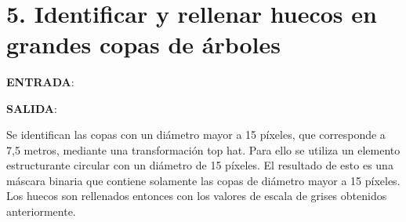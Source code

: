 \documentclass[11pt]{article}
\begin{document}
    \begin{center}
    \end{center}
    { \hspace*{\fill} \\}
    
    \hypertarget{identificar-y-rellenar-huecos-en-grandes-copas-de-uxe1rboles}{%
\section{5. Identificar y rellenar huecos en grandes copas de
árboles}\label{identificar-y-rellenar-huecos-en-grandes-copas-de-uxe1rboles}}

\textbf{ENTRADA}:

\textbf{SALIDA}:

Se identifican las copas con un diámetro mayor a 15 píxeles, que
corresponde a 7,5 metros, mediante una transformación top hat. Para ello
se utiliza un elemento estructurante circular con un diámetro de 15
píxeles. El resultado de esto es una máscara binaria que contiene
solamente las copas de diámetro mayor a 15 píxeles. Los huecos son
rellenados entonces con los valores de escala de grises obtenidos
anteriormente.
\end{document}
